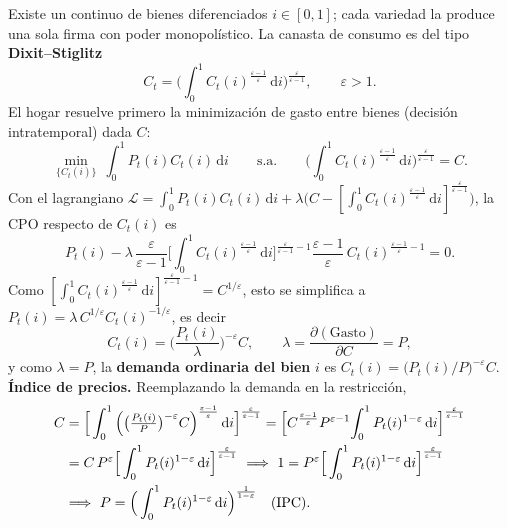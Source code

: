 \documentclass[11pt]{article}
\theoremstyle{definition}
\newcommand{\dd}{\,\mathrm{d}}
\begin{document}
Existe un continuo de bienes diferenciados $i\in[0,1]$; cada variedad la produce una sola firma con
poder monopolístico. La canasta de consumo es del tipo \textbf{Dixit--Stiglitz}
\begin{equation}
C_{t}=\Big(\int_{0}^{1}C_{t}(i)^{\frac{\varepsilon-1}{\varepsilon}}\dd i\Big)^{\frac{\varepsilon}{\varepsilon-1}},
\qquad \varepsilon>1 .
\end{equation}
El hogar resuelve primero la minimización de gasto entre bienes (decisión intratemporal) dada $C$:
\begin{equation}
\min_{\{C_{t}(i)\}}\ \int_{0}^{1}P_{t}(i)C_{t}(i)\dd i
\qquad\text{s.a.}\qquad
\Big(\int_{0}^{1}C_{t}(i)^{\frac{\varepsilon-1}{\varepsilon}}\dd i\Big)^{\frac{\varepsilon}{\varepsilon-1}}=C .
\end{equation}
Con el lagrangiano
$\mathcal{L}=\int_{0}^{1}P_{t}(i)C_{t}(i)\dd i+\lambda\big(C-[\int_{0}^{1}C_{t}(i)^{\frac{\varepsilon-1}{\varepsilon}}\dd i]^{\frac{\varepsilon}{\varepsilon-1}}\big)$,
la CPO respecto de $C_{t}(i)$ es
\begin{equation}
P_{t}(i)-\lambda\,\frac{\varepsilon}{\varepsilon-1}\Big[\int_{0}^{1}C_{t}(i)^{\frac{\varepsilon-1}{\varepsilon}}\dd i\Big]^{\frac{\varepsilon}{\varepsilon-1}-1}\frac{\varepsilon-1}{\varepsilon}\,C_{t}(i)^{\frac{\varepsilon-1}{\varepsilon}-1}=0 .
\end{equation}
Como $[\int_{0}^{1}C_{t}(i)^{\frac{\varepsilon-1}{\varepsilon}}\dd i]^{\frac{\varepsilon}{\varepsilon-1}-1}=C^{1/\varepsilon}$, esto se simplifica a
$P_{t}(i)=\lambda\,C^{1/\varepsilon}C_{t}(i)^{-1/\varepsilon}$, es decir
\begin{equation}
C_{t}(i)=\Big(\frac{P_{t}(i)}{\lambda}\Big)^{-\varepsilon}C,
\qquad
\lambda=\frac{\partial(\text{Gasto})}{\partial C}=P,
\end{equation}
y como $\lambda=P$, la \textbf{demanda ordinaria del bien }$i$ es
$C_{t}(i)=\big(P_{t}(i)/P\big)^{-\varepsilon}C$.
\textbf{Índice de precios.} Reemplazando la demanda en la restricción,
\begin{align}
C&=\Big[\int_{0}^{1}\Big(\big(\tfrac{P_{t}(i)}{P}\big)^{-\varepsilon}C\Big)^{\frac{\varepsilon-1}{\varepsilon}}\dd i\Big]^{\frac{\varepsilon}{\varepsilon-1}}
=\Big[C^{\frac{\varepsilon-1}{\varepsilon}}P^{\varepsilon-1}\!\int_{0}^{1}P_{t}(i)^{1-\varepsilon}\dd i\Big]^{\frac{\varepsilon}{\varepsilon-1}} \notag\\
&=C\,P^{\varepsilon}\Big[\int_{0}^{1}P_{t}(i)^{1-\varepsilon}\dd i\Big]^{\frac{\varepsilon}{\varepsilon-1}}
\ \Longrightarrow\
1=P^{\varepsilon}\Big[\int_{0}^{1}P_{t}(i)^{1-\varepsilon}\dd i\Big]^{\frac{\varepsilon}{\varepsilon-1}} \notag\\
&\Longrightarrow\
P=\Big(\int_{0}^{1}P_{t}(i)^{1-\varepsilon}\dd i\Big)^{\frac{1}{1-\varepsilon}}\quad\text{(IPC).}
\end{align}
\end{document}
